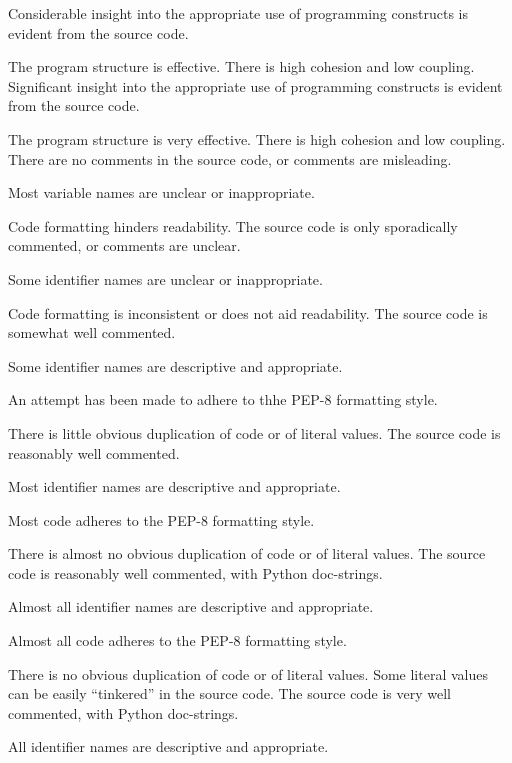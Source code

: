 \documentclass{../fal_assignment}
\begin{document}
\begin{markingrubric}
        \grade Considerable insight into the appropriate use of programming constructs is evident from the source code.
            \par The program structure is effective. There is high cohesion and low coupling.
        \grade Significant insight into the appropriate use of programming constructs is evident from the source code.
            \par The program structure is very effective. There is high cohesion and low coupling.
%
        \grade\fail There are no comments in the source code, or comments are misleading.
            \par Most variable names are unclear or inappropriate.
            \par Code formatting hinders readability.
        \grade The source code is only sporadically commented, or comments are unclear.
            \par Some identifier names are unclear or inappropriate.
            \par Code formatting is inconsistent or does not aid readability.
        \grade The source code is somewhat well commented.
            \par Some identifier names are descriptive and appropriate.
            \par An attempt has been made to adhere to thhe PEP-8 formatting style.
             \par There is little obvious duplication of code or of literal values.           
        \grade The source code is reasonably well commented.
            \par Most identifier names are descriptive and appropriate.
            \par Most code adheres to the PEP-8 formatting style.
             \par There is almost no obvious duplication of code or of literal values.   
        \grade The source code is reasonably well commented, with Python doc-strings.
            \par Almost all identifier names are descriptive and appropriate.
            \par Almost all code adheres to the PEP-8 formatting style.
             \par There is no obvious duplication of code or of literal values. Some literal values can be easily ``tinkered'' in the source code. 
        \grade The source code is very well commented, with Python doc-strings.
            \par All identifier names are descriptive and appropriate.

\end{markingrubric}
\end{document}
